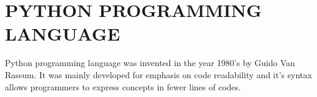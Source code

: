 \documentclass{article}
\begin{document}
	\section*{PYTHON PROGRAMMING LANGUAGE}
	Python programming language was invented in the year 1980's by Guido Van Rassum. It was mainly developed for emphasis on code readability and it's syntax allows programmers to express concepts in fewer lines of codes.
\end{document}
